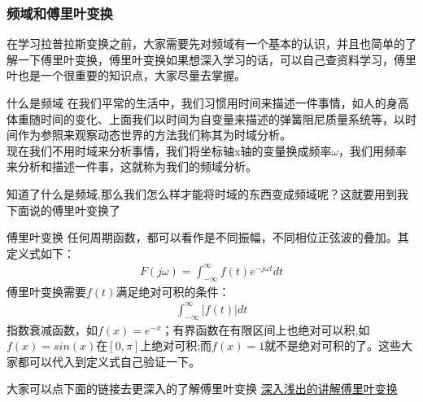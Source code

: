 \documentclass[UTF8,a4paper,12pt]{ctexart}
\begin{document}
 \subsubsection{频域和傅里叶变换}
  在学习拉普拉斯变换之前，大家需要先对频域有一个基本的认识，并且也简单的了解一下傅里叶变换，傅里叶变换如果想深入学习的话，可以自己查资料学习，傅里叶也是一个很重要的知识点，大家尽量去掌握。
  \begin{titlebox}{什么是频域}
    在我们平常的生活中，我们习惯用时间来描述一件事情，如人的身高体重随时间的变化、上面我们以时间为自变量来描述的弹簧阻尼质量系统等，以时间作为参照来观察动态世界的方法我们称其为时域分析。
    \\现在我们不用时域来分析事情，我们将坐标轴x轴的变量换成频率$\omega$，我们用频率来分析和描述一件事，这就称为我们的频域分析。
  \end{titlebox}
  \begin{flushleft}
    知道了什么是频域,那么我们怎么样才能将时域的东西变成频域呢？这就要用到我下面说的傅里叶变换了
  \end{flushleft}
  \begin{titlebox}{傅里叶变换}
    任何周期函数，都可以看作是不同振幅，不同相位正弦波的叠加。其定义式如下：
    \begin{align*}
      F\left( j\omega \right) =\int_{-\infty}^{\infty}{f\left( t \right)}e^{-j\omega t}dt
    \end{align*}
    傅里叶变换需要$f(t)$满足绝对可积的条件：
    \begin{align*}
      \int_{-\infty}^{\infty}{\left| f\left( t \right) \right|}dt
    \end{align*}
    指数衰减函数，如$f(x)=e^{-x}$；有界函数在有限区间上也绝对可以积,如$f(x)=sin(x)$在$[0,\pi]$上绝对可积;而$f(x)=1$就不是绝对可积的了。这些大家都可以代入到定义式自己验证一下。
  
  \end{titlebox}
    大家可以点下面的链接去更深入的了解傅里叶变换
    \href{https://blog.csdn.net/l494926429/article/details/51818012?ops_request_misc=%257B%2522request%255Fid%2522%253A%25228ab09c60845aafcecfa8aa2ca8e01526%2522%252C%2522scm%2522%253A%252220140713.130102334..%2522%257D&request_id=8ab09c60845aafcecfa8aa2ca8e01526&biz_id=0&utm_medium=distribute.pc_search_result.none-task-blog-2~all~top_positive~default-1-51818012-null-null.142^v101^pc_search_result_base1&utm_term=%E5%82%85%E9%87%8C%E5%8F%B6%E5%8F%98%E6%8D%A2&spm=1018.2226.3001.4187}{深入浅出的讲解傅里叶变换}
\end{document}

